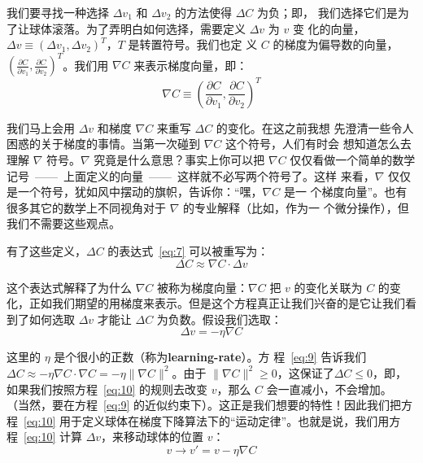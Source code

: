 我们要寻找一种选择 $\Delta v_1$ 和 $\Delta v_2$ 的方法使得 $\Delta C$ 为负；即，
我们选择它们是为了让球体滚落。为了弄明白如何选择，需要定义 $\Delta v$ 为 $v$ 变
化的向量，$\Delta v \equiv (\Delta v_1, \Delta v_2)^T$，$T$ 是转置符号。我们也定
义 $C$ 的梯度为偏导数的向量，$\left(\frac{\partial C}{\partial v_1},
\frac{\partial C}{\partial v_2}\right)^T$。我们用 $\nabla C$ 来表示梯度向量，即：
\begin{equation}
  \nabla C \equiv \left( \frac{\partial C}{\partial v_1}, \frac{\partial
      C}{\partial v_2} \right)^T
  \label{eq:8}\tag{8}
\end{equation}

我们马上会用 $\Delta v$ 和梯度 $\nabla C$ 来重写 $\Delta C$ 的变化。在这之前我想
先澄清一些令人困惑的关于梯度的事情。当第一次碰到 $\nabla C$ 这个符号，人们有时会
想知道怎么去理解 $\nabla$ 符号。$\nabla$ 究竟是什么意思？事实上你可以把 $\nabla
C$ 仅仅看做一个简单的数学记号~——~上面定义的向量~——~这样就不必写两个符号了。这样
来看，$\nabla$ 仅仅是一个符号，犹如风中摆动的旗帜，告诉你：“嘿，$\nabla C$ 是一
个梯度向量”。也有很多其它的数学上不同视角对于 $\nabla$ 的专业解释（比如，作为一
  个微分操作），但我们不需要这些观点。

有了这些定义，$\Delta C$ 的表达式~\eqref{eq:7} 可以被重写为：
\begin{equation}
  \Delta C \approx \nabla C \cdot \Delta v
  \label{eq:9}\tag{9}
\end{equation}

这个表达式解释了为什么 $\nabla C$ 被称为梯度向量：$\nabla C$ 把 $v$ 的变化关联为
$C$ 的变化，正如我们期望的用梯度来表示。但是这个方程真正让我们兴奋的是它让我们看
到了如何选取 $\Delta v$ 才能让 $\Delta C$ 为负数。假设我们选取：
\begin{equation}
  \Delta v = -\eta \nabla C
  \label{eq:10}\tag{10}
\end{equation}

这里的 $\eta$ 是个很小的正数（称为\textbf{\gls{learning-rate}}）。方
程~\eqref{eq:9} 告诉我们 $\Delta C \approx -\eta \nabla C \cdot \nabla C = -\eta
\|\nabla C\|^2$。由于 $\| \nabla C \|^2 \geq 0$，这保证了$\Delta C \leq 0$，即，
如果我们按照方程~\eqref{eq:10} 的规则去改变 $v$，那么 $C$ 会一直减小，不会增加。
（当然，要在方程~\eqref{eq:9} 的近似约束下）。这正是我们想要的特性！因此我们把方
程~\eqref{eq:10} 用于定义球体在梯度下降算法下的“运动定律”。也就是说，我们用方
程~\eqref{eq:10} 计算 $\Delta v$，来移动球体的位置 $v$：
\begin{equation}
  v \rightarrow v' = v -\eta \nabla C
  \label{eq:11}\tag{11}
\end{equation}

